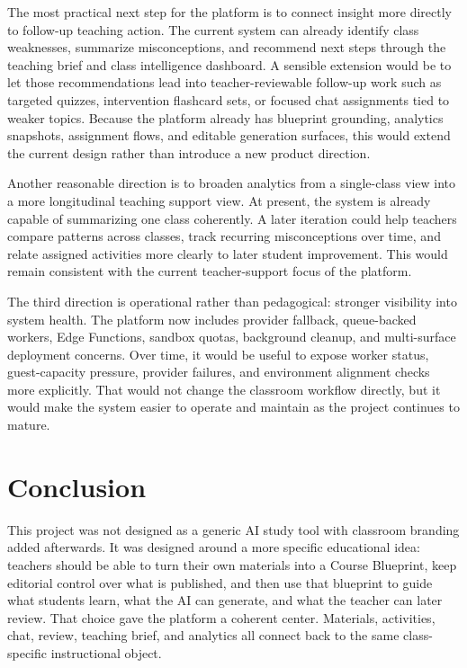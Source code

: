 \documentclass[11pt,a4paper]{article}
\begin{document}
The most practical next step for the platform is to connect insight more directly to follow-up
teaching action. The current system can already identify class weaknesses, summarize misconceptions,
and recommend next steps through the teaching brief and class intelligence dashboard. A sensible
extension would be to let those recommendations lead into teacher-reviewable follow-up work such as
targeted quizzes, intervention flashcard sets, or focused chat assignments tied to weaker topics.
Because the platform already has blueprint grounding, analytics snapshots, assignment flows, and
editable generation surfaces, this would extend the current design rather than introduce a new
product direction.

Another reasonable direction is to broaden analytics from a single-class view into a more
longitudinal teaching support view. At present, the system is already capable of summarizing one
class coherently. A later iteration could help teachers compare patterns across classes, track
recurring misconceptions over time, and relate assigned activities more clearly to later student
improvement. This would remain consistent with the current teacher-support focus of the platform.

The third direction is operational rather than pedagogical: stronger visibility into system health.
The platform now includes provider fallback, queue-backed workers, Edge Functions, sandbox quotas,
background cleanup, and multi-surface deployment concerns. Over time, it would be useful to expose
worker status, guest-capacity pressure, provider failures, and environment alignment checks more
explicitly. That would not change the classroom workflow directly, but it would make the system
easier to operate and maintain as the project continues to mature.

\section{Conclusion}

This project was not designed as a generic AI study tool with classroom branding added afterwards.
It was designed around a more specific educational idea: teachers should be able to turn their own
materials into a Course Blueprint, keep editorial control over what is published, and then use that
blueprint to guide what students learn, what the AI can generate, and what the teacher can later
review. That choice gave the platform a coherent center. Materials, activities, chat, review,
teaching brief, and analytics all connect back to the same class-specific instructional object.
\end{document}
